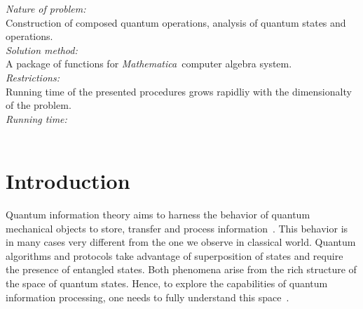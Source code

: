 \documentclass[a4paper,11pt]{elsart}
\newcommand{\Mathematica}{\emph{Mathematica}}
\newcommand{\1}{{\rm 1\hspace{-0.9mm}l}}
\begin{document}
\begin{small}
{\em Nature of problem:}\\
  Construction of composed quantum operations, analysis of quantum states and
  operations.
   \\
{\em Solution method:}\\
  A package of functions for \Mathematica\ computer algebra system.
   \\
{\em Restrictions:}\\
  Running time of the presented procedures grows rapidliy with the dimensionalty
  of the problem.
   \\
{\em Running time:}\\
   \\

\end{small}







\section{Introduction}\label{sec:intro}
Quantum information theory aims to harness the behavior of quantum mechanical
objects to store, transfer and process information~\cite{hayashi}. This behavior
is in many cases very different from the one we observe in classical world.
Quantum algorithms and protocols take advantage of superposition of states and
require the presence of entangled states. Both phenomena arise from the rich
structure of the space of quantum states. Hence, to explore the capabilities of
quantum information processing, one needs to fully understand this
space~\cite{BZ06}. 
\end{document}
